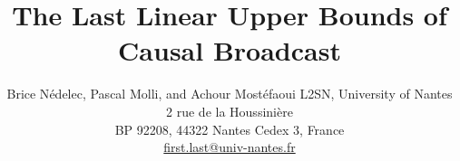 \documentclass{class-for-drafts}
\begin{document}
 

\title{The Last Linear Upper Bounds of Causal Broadcast}



\newcommand{\affLSNN}{L2SN, University of Nantes\\
  2 rue de la Houssini{\`e}re\\
  BP 92208, 44322 Nantes Cedex 3, France\\
  \url{first.last@univ-nantes.fr}}


\author{Brice N{\'e}delec, Pascal Molli, and Achour Most{\'e}faoui \aff \affLSNN}



\proceedings{}


\maketitle











%

  
\end{document}
